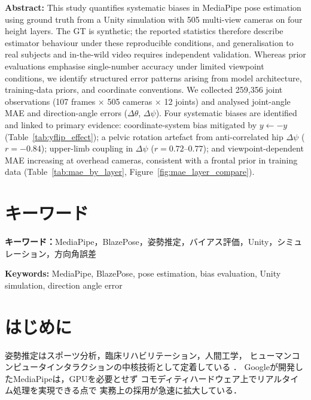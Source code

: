 \documentclass[twocolumn]{article}
\begin{document}
\medskip
\noindent\textbf{Abstract:}\quad
This study quantifies systematic biases in MediaPipe pose estimation using
ground truth from a Unity simulation with 505 multi-view cameras on four
height layers.
The GT is synthetic; the reported statistics therefore describe estimator
behaviour under these reproducible conditions, and generalisation to real
subjects and in-the-wild video requires independent validation.
Whereas prior evaluations emphasise single-number accuracy under limited
viewpoint conditions, we identify structured error patterns arising from model
architecture, training-data priors, and coordinate conventions.
We collected 259{,}356 joint observations (107 frames $\times$ 505 cameras
$\times$ 12 joints) and analysed joint-angle MAE and direction-angle errors
($\Delta\theta$, $\Delta\psi$).
Four systematic biases are identified and linked to primary evidence:
coordinate-system bias mitigated by $y \leftarrow -y$
(Table~\ref{tab:yflip_effect}); a pelvic rotation artefact from
anti-correlated hip $\Delta\psi$ ($r=-0.84$); upper-limb coupling in
$\Delta\psi$ ($r=0.72$--$0.77$); and viewpoint-dependent MAE increasing at
overhead cameras, consistent with a frontal prior in training data
(Table~\ref{tab:mae_by_layer}, Figure~\ref{fig:mae_layer_compare}).

\vspace{-0.8em}

\section*{キーワード}
\noindent\textbf{キーワード：}MediaPipe，BlazePose，姿勢推定，バイアス評価，Unity，シミュレーション，方向角誤差

\noindent\textbf{Keywords:} MediaPipe, BlazePose, pose estimation, bias evaluation, Unity simulation, direction angle error

\vspace{-0.5em}

\section{はじめに}

姿勢推定はスポーツ分析，臨床リハビリテーション，人間工学，
ヒューマンコンピュータインタラクションの中核技術として定着している
\cite{mediapipe,blazepose}．
Googleが開発したMediaPipeは，GPUを必要とせず
コモディティハードウェア上でリアルタイム処理を実現できる点で
実務上の採用が急速に拡大している\cite{mediapipe}．
\end{document}

